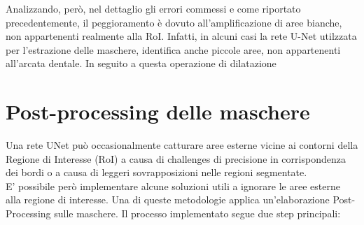 \documentclass[12pt,a4paper,openright,twoside]{book}
\begin{document}
Analizzando, però, nel dettaglio gli errori commessi e come riportato precedentemente, il peggioramento è dovuto all'amplificazione di aree bianche, non appartenenti realmente alla RoI. Infatti, in alcuni casi la rete U-Net utilzzata per l'estrazione delle maschere, identifica anche piccole aree, non appartenenti all'arcata dentale. In seguito a questa operazione di dilatazione 


\section{Post-processing delle maschere}
Una rete UNet può occasionalmente catturare aree esterne vicine ai contorni della Regione di Interesse (RoI) a causa di challenges di precisione in corrispondenza dei bordi o a causa di leggeri sovrapposizioni nelle regioni segmentate.\\
E' possibile però implementare alcune soluzioni utili a ignorare le aree esterne alla regione di interesse. Una di queste metodologie applica un'elaborazione Post-Processing sulle maschere. Il processo implementato segue due step principali:
\end{document}
